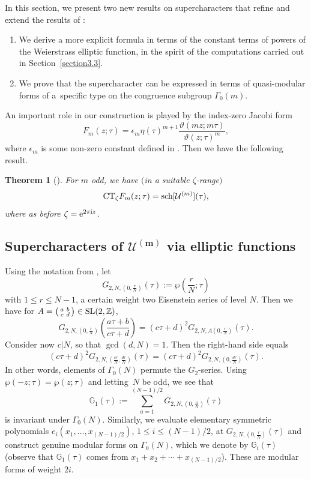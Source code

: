 \documentclass[pdftex]{sigma}
\numberwithin{equation}{section}
\newtheorem{Theorem}{Theorem}[section]
\theoremstyle{definition}
\begin{document}
In this section, we present two new results on supercharacters that refine and extend the results of \cite{AM}:
\begin{enumerate}\itemsep=0pt
\item We derive a more explicit formula in terms of the constant terms of powers of the Weierstrass elliptic function, in the spirit of the computations carried out in Section~\ref{section3.3}.

\item We prove that the supercharacter can be expressed in terms of quasi-modular forms of a~specific type on the congruence subgroup $\Gamma_0(m)$.
\end{enumerate}
An important role in our construction is played by the index-zero Jacobi form
\begin{equation*} %
F_m(z;\tau)=\epsilon_m \eta(\tau)^{m+1} \frac{\vartheta(mz;m\tau)}{\vartheta(z;\tau)^m},
\end{equation*}
where $\epsilon_m$ is some non-zero constant defined in \cite{AM}. Then we have the following result.

\begin{Theorem}[\cite{AM}] For $m$ odd, we have $($in a suitable $\zeta$-range$)$
\[
{\rm CT}_{\zeta} F_m(z;\tau)={\rm sch}[\mathcal{U}^{(m)}](\tau),
\]
where as before $\zeta={\rm e}^{2 \pi {\rm i} z}$.
\end{Theorem}

\subsection[Supercharacters of U\^{}\{(m)\} via elliptic functions]{Supercharacters of $\boldsymbol{\mathcal{U}^{(m)}}$ via elliptic functions}\label{section4.1}

Using the notation from \cite{Lang}, let
\[
G_{2,N,(0,\frac{r}{N})}(\tau):=\wp \left(\frac{r}{N};\tau \right)
\]
with $1 \leq r \leq N-1$, a certain weight two Eisenstein series of level $N$.
Then we have for $A=\left(\begin{smallmatrix} a & b \\ c & d \end{smallmatrix}\right) \in {\rm SL}(2,\mathbb{Z})$,
\[
G_{2,N,(0,\frac{r}{N})}\left(\frac{a \tau+b}{c \tau +d}\right)=(c\tau+d)^2 G_{2,N,A(0,\frac{r}{N}) }(\tau).
\]
Consider now $c | N$, so that $\gcd(d,N)=1$. Then the right-hand side equals
\[
(c\tau+d)^2 G_{2,N, (\frac{cr}{N}, \frac{dr}{N})}(\tau)= (c\tau+d)^2 G_{2,N, (0, \frac{dr}{N})}(\tau).
\]
In other words, elements of $\Gamma_0(N)$ permute the $G_2$-series. Using $\wp(-z;\tau)=\wp(z;\tau)$ and letting~$N$ be
odd, we see that
\begin{equation*} %
\mathbb{G}_1(\tau):=\sum_{a=1}^{(N-1)/2} G_{2,N, (0, \frac{a}{N})}(\tau)
\end{equation*}
is invariant under $\Gamma_0(N)$. Similarly, we evaluate elementary symmetric polynomials $e_i(x_1,\dots,\allowbreak x_{(N-1)/2})$, $ 1 \leq i \leq (N-1)/2$,
at $G_{2,N,(0,\frac{r}{N})}(\tau)$ and construct genuine modular forms on $\Gamma_0(N)$, which we denote by $\mathbb{G}_i(\tau)$ (observe that
$\mathbb{G}_1(\tau)$ comes from $x_1+x_2+\cdots+x_{(N-1)/2}$).
These are modular forms of weight $2i$.
\end{document}
